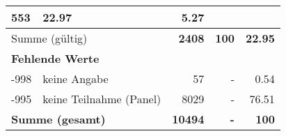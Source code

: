 \begin{longtable}{lXrrr}
       \num{553} &
       \num[round-mode=places,round-precision=2]{22.97} &
         \num[round-mode=places,round-precision=2]{5.27} \\
     \midrule
     \multicolumn{2}{l}{Summe (gültig)} &
       \textbf{\num{2408}} &
     \textbf{\num{100}} &
       \textbf{\num[round-mode=places,round-precision=2]{22.95}} \\
     \multicolumn{5}{l}{\textbf{Fehlende Werte}}\\
       -998 &
       keine Angabe &
         \num{57} &
        - &
         \num[round-mode=places,round-precision=2]{0.54} \\
       -995 &
       keine Teilnahme (Panel) &
         \num{8029} &
        - &
         \num[round-mode=places,round-precision=2]{76.51} \\
     \midrule
     \multicolumn{2}{l}{\textbf{Summe (gesamt)}} &
          \textbf{\num{10494}} &
        \textbf{-} &
        \textbf{\num{100}} \\
     \bottomrule
     \end{longtable}
     
